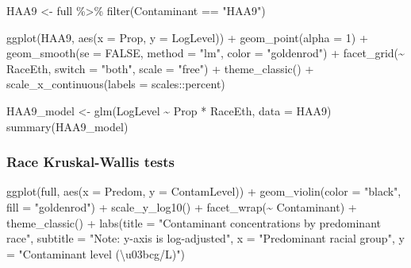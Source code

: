 \documentclass[
  letterpaper,
  DIV=11,
  numbers=noendperiod]{scrartcl}
\newenvironment{Shaded}{\begin{snugshade}}{\end{snugshade}}
\newcommand{\AttributeTok}[1]{\textcolor[rgb]{0.40,0.45,0.13}{#1}}
\newcommand{\ConstantTok}[1]{\textcolor[rgb]{0.56,0.35,0.01}{#1}}
\newcommand{\DecValTok}[1]{\textcolor[rgb]{0.68,0.00,0.00}{#1}}
\newcommand{\FunctionTok}[1]{\textcolor[rgb]{0.28,0.35,0.67}{#1}}
\newcommand{\NormalTok}[1]{\textcolor[rgb]{0.00,0.23,0.31}{#1}}
\newcommand{\OtherTok}[1]{\textcolor[rgb]{0.00,0.23,0.31}{#1}}
\newcommand{\SpecialCharTok}[1]{\textcolor[rgb]{0.37,0.37,0.37}{#1}}
\newcommand{\StringTok}[1]{\textcolor[rgb]{0.13,0.47,0.30}{#1}}
\begin{document}
\begin{Shaded}
\begin{Highlighting}[]
\NormalTok{HAA9 }\OtherTok{\textless{}{-}}\NormalTok{ full }\SpecialCharTok{\%\textgreater{}\%} 
  \FunctionTok{filter}\NormalTok{(Contaminant }\SpecialCharTok{==} \StringTok{"HAA9"}\NormalTok{)}
  
\FunctionTok{ggplot}\NormalTok{(HAA9, }\FunctionTok{aes}\NormalTok{(}\AttributeTok{x =}\NormalTok{ Prop, }\AttributeTok{y =}\NormalTok{ LogLevel)) }\SpecialCharTok{+}
  \FunctionTok{geom\_point}\NormalTok{(}\AttributeTok{alpha =} \DecValTok{1}\NormalTok{) }\SpecialCharTok{+}
  \FunctionTok{geom\_smooth}\NormalTok{(}\AttributeTok{se =} \ConstantTok{FALSE}\NormalTok{, }\AttributeTok{method =} \StringTok{"lm"}\NormalTok{, }\AttributeTok{color =} \StringTok{"goldenrod"}\NormalTok{) }\SpecialCharTok{+}
  \FunctionTok{facet\_grid}\NormalTok{(}\SpecialCharTok{\textasciitilde{}}\NormalTok{ RaceEth, }\AttributeTok{switch =} \StringTok{"both"}\NormalTok{, }\AttributeTok{scale =} \StringTok{"free"}\NormalTok{) }\SpecialCharTok{+}
  \FunctionTok{theme\_classic}\NormalTok{() }\SpecialCharTok{+}
  \FunctionTok{scale\_x\_continuous}\NormalTok{(}\AttributeTok{labels =}\NormalTok{ scales}\SpecialCharTok{::}\NormalTok{percent)}

\NormalTok{HAA9\_model }\OtherTok{\textless{}{-}} \FunctionTok{glm}\NormalTok{(LogLevel }\SpecialCharTok{\textasciitilde{}}\NormalTok{ Prop }\SpecialCharTok{*}\NormalTok{ RaceEth, }\AttributeTok{data =}\NormalTok{ HAA9)}
\FunctionTok{summary}\NormalTok{(HAA9\_model)}
\end{Highlighting}
\end{Shaded}

\hypertarget{race-kruskal-wallis-tests}{%
\subsubsection{Race Kruskal-Wallis
tests}\label{race-kruskal-wallis-tests}}

\begin{Shaded}
\begin{Highlighting}[]
\FunctionTok{ggplot}\NormalTok{(full, }\FunctionTok{aes}\NormalTok{(}\AttributeTok{x =}\NormalTok{ Predom, }\AttributeTok{y =}\NormalTok{ ContamLevel)) }\SpecialCharTok{+}
  \FunctionTok{geom\_violin}\NormalTok{(}\AttributeTok{color =} \StringTok{"black"}\NormalTok{, }\AttributeTok{fill =} \StringTok{"goldenrod"}\NormalTok{) }\SpecialCharTok{+}
  \FunctionTok{scale\_y\_log10}\NormalTok{() }\SpecialCharTok{+}
  \FunctionTok{facet\_wrap}\NormalTok{(}\SpecialCharTok{\textasciitilde{}}\NormalTok{ Contaminant) }\SpecialCharTok{+}
  \FunctionTok{theme\_classic}\NormalTok{() }\SpecialCharTok{+}
  \FunctionTok{labs}\NormalTok{(}\AttributeTok{title =} \StringTok{"Contaminant concentrations by predominant race"}\NormalTok{,}
       \AttributeTok{subtitle =} \StringTok{"Note: y{-}axis is log{-}adjusted"}\NormalTok{,}
       \AttributeTok{x =} \StringTok{"Predominant racial group"}\NormalTok{,}
       \AttributeTok{y =} \StringTok{"Contaminant level (\textbackslash{}u03bcg/L)"}\NormalTok{)}
\end{Highlighting}
\end{Shaded}
\end{document}

